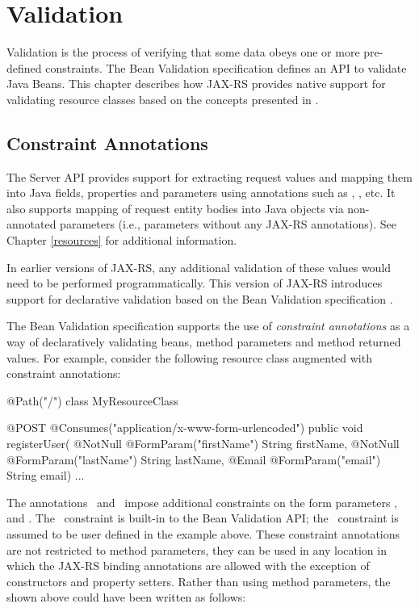 \chapter{Validation}
\label{validation}

Validation is the process of verifying that some data obeys one or more pre-defined constraints. The Bean Validation specification \cite{bv11} defines an API to validate Java Beans. This chapter describes how JAX-RS provides native support for validating resource classes based on the concepts presented in \cite{bv11}.

\section{Constraint Annotations}
\label{constraint_annotations}

The Server API provides support for extracting request values and mapping them into Java fields, properties and parameters using annotations such as , , etc. It also supports mapping of request entity bodies into Java objects via non-annotated parameters (i.e., parameters without any JAX-RS annotations). See Chapter \ref{resources} for additional information.

In earlier versions of JAX-RS, any additional validation of these values would need to be performed programmatically. This version of JAX-RS introduces support for declarative validation based on the Bean Validation specification \cite{bv11}. 

The Bean Validation specification \cite{bv11} supports the use of \emph{constraint annotations} as a way of declaratively validating beans, method parameters and method returned values. For example, consider the following resource class augmented with constraint annotations:

\begin{listing}{1}
@Path("/")
class MyResourceClass {

  @POST
  @Consumes("application/x-www-form-urlencoded")
  public void registerUser(
    @NotNull @FormParam("firstName") String firstName,
    @NotNull @FormParam("lastName") String lastName,
    @Email @FormParam("email") String email) {
    ...
  }
}
\end{listing}

The annotations \NotNull\ and \Email\ impose additional constraints on the form parameters ,  and . The \NotNull\ constraint is built-in to the Bean Validation API; the \Email\ constraint is assumed to be user defined in the example above. These constraint annotations are not restricted to method parameters, they can be used in any location in which the JAX-RS binding annotations are allowed with the exception of constructors and property setters. Rather than using method parameters, the  shown above could have been written as follows:

